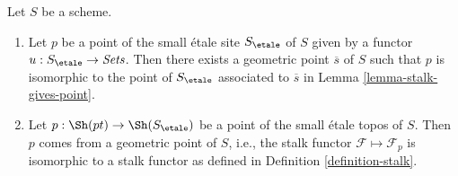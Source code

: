 %
\begin{lemma}
\label{lemma-points-small-etale-site}
Let $S$ be a scheme.
\begin{enumerate}
\item Let $p$ be a point of the small \'etale site
$S_\etale$ of $S$ given by a functor
$u : S_\etale \to \textit{Sets}$.
Then there exists a geometric point $\overline{s}$ of $S$ such that
$p$ is isomorphic to the point of $S_\etale$ associated to
$\overline{s}$ in
Lemma \ref{lemma-stalk-gives-point}.
\item Let $p : \Sh(pt) \to \Sh(S_\etale)$ be a point
of the small \'etale topos of $S$. Then $p$ comes from a geometric point
of $S$, i.e., the stalk functor $\mathcal{F} \mapsto \mathcal{F}_p$
is isomorphic to a stalk functor as defined in
Definition \ref{definition-stalk}.
\end{enumerate}
\end{lemma}

